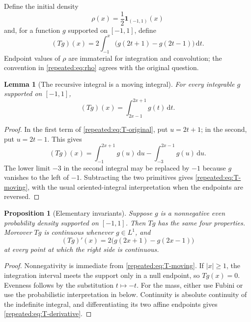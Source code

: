 \documentclass[11pt,oneside]{article}
\newtheorem{proposition}[theorem]{Proposition}
\newtheorem{lemma}[theorem]{Lemma}
\theoremstyle{definition}
\theoremstyle{remark}
\newcommand{\dd}{\,\mathrm d}
\begin{document}
Define the initial density
\begin{equation}
 \rho(x)=\frac12\mathbf 1_{(-1,1)}(x)                       \label{repeated:eq:rho}
\end{equation}
and, for a function $g$ supported on $[-1,1]$, define
\begin{equation}
 (Tg)(x)=2\int_{-1}^{x}\bigl(g(2t+1)-g(2t-1)\bigr)\dd t.   \label{repeated:eq:T-original}
\end{equation}
Endpoint values of $\rho$ are immaterial for integration and convolution; the convention in
\eqref{repeated:eq:rho} agrees with the original question.

\begin{lemma}[The recursive integral is a moving integral]
\label{repeated:lem:moving-integral}
For every integrable $g$ supported on $[-1,1]$,
\begin{equation}
 (Tg)(x)=\int_{2x-1}^{2x+1}g(t)\dd t.                       \label{repeated:eq:T-moving}
\end{equation}
\end{lemma}

\begin{proof}
In the first term of \eqref{repeated:eq:T-original}, put $u=2t+1$; in the second, put $u=2t-1$.
This gives
\[
 (Tg)(x)=\int_{-1}^{2x+1}g(u)\dd u-\int_{-3}^{2x-1}g(u)\dd u.
\]
The lower limit $-3$ in the second integral may be replaced by $-1$ because $g$ vanishes to
the left of $-1$.  Subtracting the two primitives gives \eqref{repeated:eq:T-moving}, with the usual
oriented-integral interpretation when the endpoints are reversed.
\end{proof}

\begin{proposition}[Elementary invariants]
\label{repeated:prop:invariants}
Suppose $g$ is a nonnegative even probability density supported on $[-1,1]$.  Then $Tg$ has
the same four properties.  Moreover $Tg$ is continuous whenever $g\in L^1$, and
\begin{equation}
 (Tg)'(x)=2\bigl(g(2x+1)-g(2x-1)\bigr)                     \label{repeated:eq:T-derivative}
\end{equation}
at every point at which the right side is continuous.
\end{proposition}

\begin{proof}
Nonnegativity is immediate from \eqref{repeated:eq:T-moving}.  If $|x|\ge1$, the integration interval
meets the support only in a null endpoint, so $Tg(x)=0$.  Evenness follows by the substitution
$t\mapsto-t$.  For the mass, either use Fubini or use the probabilistic interpretation in
 below.  Continuity is absolute continuity of the indefinite integral,
and differentiating its two affine endpoints gives \eqref{repeated:eq:T-derivative}.
\end{proof}
\end{document}
